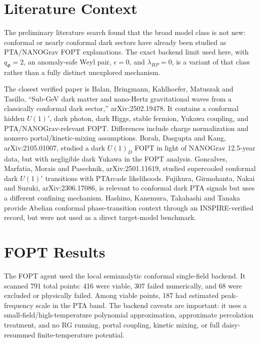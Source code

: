\documentclass[11pt]{article}
\begin{document}
\section{Literature Context}
The preliminary literature search found that the broad model class is not new: conformal or nearly conformal dark sectors have already been studied as PTA/NANOGrav FOPT explanations.  The exact backend limit used here, with \(q_\Phi=2\), an anomaly-safe Weyl pair, \(\epsilon=0\), and \(\lambda_{HP}=0\), is a variant of that class rather than a fully distinct unexplored mechanism.

The closest verified paper is Balan, Bringmann, Kahlhoefer, Matuszak and Tasillo, ``Sub-GeV dark matter and nano-Hertz gravitational waves from a classically conformal dark sector,'' arXiv:2502.19478.  It contains a conformal hidden \(U(1)'\), dark photon, dark Higgs, stable fermion, Yukawa coupling, and PTA/NANOGrav-relevant FOPT.  Differences include charge normalization and nonzero portal/kinetic-mixing assumptions.  Borah, Dasgupta and Kang, arXiv:2105.01007, studied a dark \(U(1)_D\) FOPT in light of NANOGrav 12.5-year data, but with negligible dark Yukawa in the FOPT analysis.  Goncalves, Marfatia, Morais and Pasechnik, arXiv:2501.11619, studied supercooled conformal dark \(U(1)'\) transitions with PTArcade likelihoods.  Fujikura, Girmohanta, Nakai and Suzuki, arXiv:2306.17086, is relevant to conformal dark PTA signals but uses a different confining mechanism.  Hashino, Kanemura, Takahashi and Tanaka provide Abelian conformal phase-transition context through an INSPIRE-verified record, but were not used as a direct target-model benchmark.

\section{FOPT Results}
The FOPT agent used the local semianalytic conformal single-field backend.  It scanned 791 total points: 416 were viable, 307 failed numerically, and 68 were excluded or physically failed.  Among viable points, 187 had estimated peak-frequency scale in the PTA band.  The backend caveats are important: it uses a small-field/high-temperature polynomial approximation, approximate percolation treatment, and no RG running, portal coupling, kinetic mixing, or full daisy-resummed finite-temperature potential.
\end{document}
